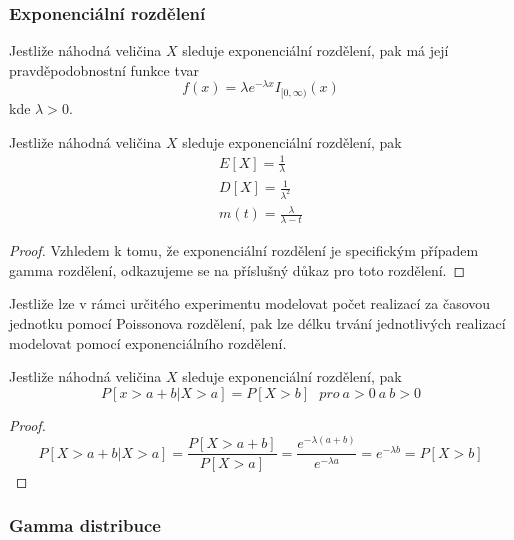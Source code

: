 \subsubsection{Exponenciální rozdělení}

\begin{definition}
Jestliže náhodná veličina $X$ sleduje exponenciální rozdělení, pak má její pravděpodobnostní funkce tvar
\begin{equation*}
f(x) = \lambda e^{- \lambda x}I_{[0, \infty)}(x)
\end{equation*}
kde $\lambda > 0$.
\end{definition}
\begin{theorem}
Jestliže náhodná veličina $X$ sleduje exponenciální rozdělení, pak
\begin{gather*}
E[X] = \frac{1}{\lambda}\\
D[X] = \frac{1}{\lambda^2}\\
m(t) = \frac{\lambda}{\lambda - t}
\end{gather*}
\end{theorem}

\begin{proof}
Vzhledem k tomu, že exponenciální rozdělení je specifickým případem gamma rozdělení, odkazujeme se na příslušný důkaz pro toto rozdělení.
\end{proof}

Jestliže lze v rámci určitého experimentu modelovat počet realizací za časovou jednotku pomocí Poissonova rozdělení, pak lze délku trvání jednotlivých realizací modelovat pomocí exponenciálního rozdělení.

\begin{theorem}
Jestliže náhodná veličina $X$ sleduje exponenciální rozdělení, pak
\begin{equation*}
P[x > a + b| X > a] = P[X > b]~~~\textit{pro}~a > 0 ~\textit{a}~ b > 0
\end{equation*}
\end{theorem}
\begin{proof}
\begin{equation*}
P[X > a + b | X > a] = \frac{P[X > a + b]}{P[X > a]} = \frac{e^{-\lambda(a + b)}}{e^{-\lambda a}} = e^{-\lambda b} = P[X > b]
\end{equation*}
\end{proof}

\subsubsection{Gamma distribuce}


